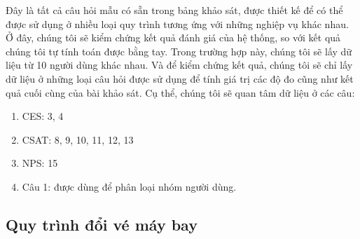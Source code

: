 Đây là tất cả câu hỏi mẫu có sẵn trong bảng khảo sát, được thiết kế để có thể được sử dụng ở nhiều loại quy trình tương ứng với những nghiệp vụ khác nhau. 
Ở đây, chúng tôi sẽ kiểm chứng kết quả đánh giá của hệ thống, so với kết quả chúng tôi tự tính toán được bằng tay. Trong trường hợp này, 
chúng tôi sẽ lấy dữ liệu từ 10 người dùng khác nhau. Và để kiểm chứng kết quả, chúng tôi sẽ chỉ lấy dữ liệu ở những loại câu hỏi được sử dụng để 
tính giá trị các độ đo cũng như kết quả cuối cùng của bài khảo sát. Cụ thể, chúng tôi sẽ quan tâm dữ liệu ở các câu:
\begin{enumerate}
    \item CES: 3, 4
    \item CSAT: 8, 9, 10, 11, 12, 13
    \item NPS: 15
    \item Câu 1: được dùng để phân loại nhóm người dùng.
\end{enumerate}

\subsection{Quy trình đổi vé máy bay}

